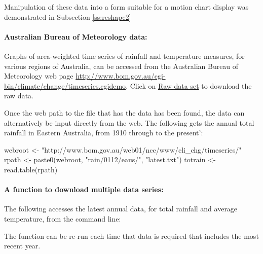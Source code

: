 Manipulation of these data into a form suitable for a motion
chart display was demonstrated in Subsection \ref{ss:reshape2}

\paragraph{Australian Bureau of Meteorology data:}
Graphs of area-weighted time series of rainfall and temperature
measures, for various regions of Australia, can be accessed from the
Australian Bureau of Meteorology web page
\url{http://www.bom.gov.au/cgi-bin/climate/change/timeseries.cgidemo}.
Click on \underline{Raw data set} to download the raw data.

Once the web path to the file that has the data has been found,
the data can alternatively be input directly from the web.
The following gets the annual total rainfall in Eastern Australia,
from 1910 through to the present':
\begin{fullwidth}
\begin{Schunk}
\begin{Sinput}
webroot <- "http://www.bom.gov.au/web01/ncc/www/cli_chg/timeseries/"
rpath <- paste0(webroot, "rain/0112/eaus/", "latest.txt")
totrain <- read.table(rpath)
\end{Sinput}
\end{Schunk}
\end{fullwidth}

\paragraph{A function to download multiple data series:}
The following accesses the latest annual data, for total rainfall
and average temperature, from the command line:
\begin{fullwidth}
\begin{Schunk}
\end{Schunk}
\end{fullwidth}
\noindent
The function can be re-run each time that data is required that
includes the most recent year.

